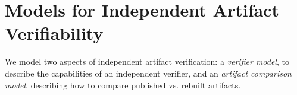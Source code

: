 


\section{Models for Independent Artifact Verifiability}
\label{sec:verifiability-model}

We model two aspects of independent artifact verification:
  a \textit{verifier model}, to describe the capabilities of an independent verifier,
  and
  an \textit{artifact comparison model}, describing how to compare published vs. rebuilt artifacts.

